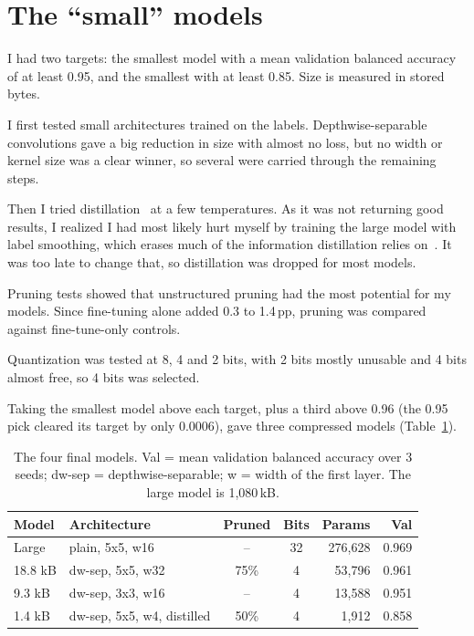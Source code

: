 \documentclass[10pt,a4paper,twocolumn]{article}
\begin{document}
\section{The ``small'' models}
I had two targets: the smallest model with a mean validation balanced accuracy of at least 0.95, and the smallest
with at least 0.85. Size is measured in stored bytes.

I first tested small architectures trained on the labels. Depthwise-separable convolutions gave a big reduction in
size with almost no loss, but no width or kernel size was a clear winner, so several were carried through the
remaining steps.

Then I tried distillation~\cite{hinton} at a few temperatures. As it was not returning good results, I realized
I had most likely hurt myself by training the large model with label smoothing, which erases much of the
information distillation relies on~\cite{muller}. It was too late to change that, so distillation was dropped for
most models.

Pruning tests showed that unstructured pruning had the most potential for my models. Since fine-tuning alone
added 0.3 to 1.4\,pp, pruning was compared against fine-tune-only controls.

Quantization was tested at 8, 4 and 2 bits, with 2 bits mostly unusable and 4 bits almost free, so 4 bits was
selected.

Taking the smallest model above each target, plus a third above 0.96 (the 0.95 pick cleared its target by only
0.0006), gave three compressed models (Table~\ref{tab:models}).

\begin{table}[t]
  \centering\footnotesize
  \setlength{\tabcolsep}{2pt}
  \begin{tabular}{@{}llccrr@{}}
    \toprule
    Model & Architecture & Pruned & Bits & Params & Val \\
    \midrule
    Large   & plain, 5x5, w16           & --    & 32 & 276,628 & 0.969 \\
    18.8 kB & dw-sep, 5x5, w32          & 75\%  & 4  & 53,796  & 0.961 \\
    9.3 kB  & dw-sep, 3x3, w16          & --    & 4  & 13,588  & 0.951 \\
    1.4 kB  & dw-sep, 5x5, w4, distilled & 50\% & 4  & 1,912   & 0.858 \\
    \bottomrule
  \end{tabular}
  \caption{The four final models. Val = mean validation balanced accuracy over 3 seeds; dw-sep =
           depthwise-separable; w = width of the first layer. The large model is 1,080\,kB.}
  \label{tab:models}
\end{table}
\end{document}
